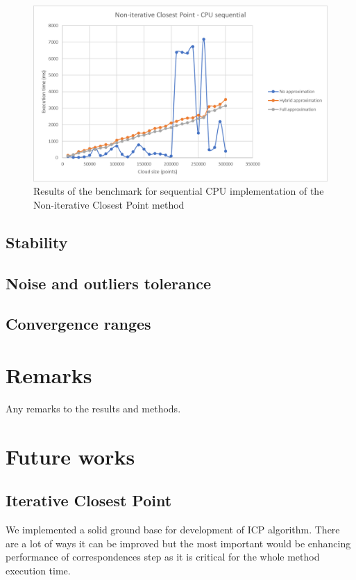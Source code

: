 \documentclass[titlepage]{article}
\begin{document}
\begin{figure}[H]
\includegraphics[width=\textwidth]{ms-nicp-1.png}
\caption{Results of the benchmark for sequential CPU implementation of the Non-iterative Closest Point method}
\end{figure}

\subsection{Stability}

\subsection{Noise and outliers tolerance}

\subsection{Convergence ranges}

\section{Remarks}
Any remarks to the results and methods.

\section{Future works}

\subsection{Iterative Closest Point}
We implemented a solid ground base for development of ICP algorithm. There are a lot of ways it can be improved but the most important would be enhancing performance of correspondences step as it is critical for the whole method execution time. 
\end{document}
